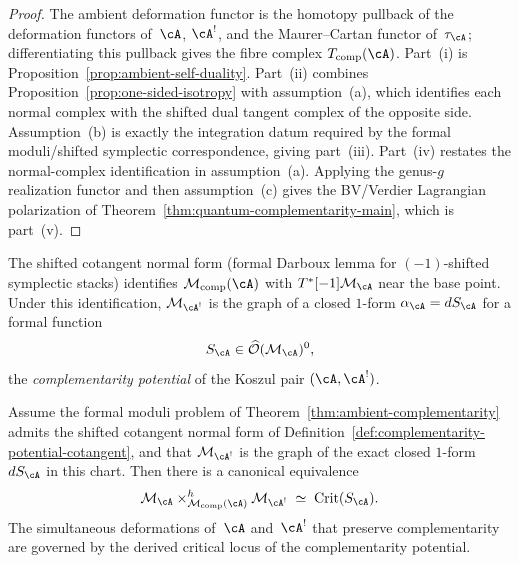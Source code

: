 \begin{proof}
The ambient deformation functor is the homotopy pullback of the
deformation functors of~$\cA$, $\cA^!$, and the
Maurer--Cartan functor of~$\tau_\cA$; differentiating this
pullback gives the fibre complex
$T_{\mathrm{comp}}(\cA)$. Part~\textup{(i)} is
Proposition~\ref{prop:ambient-self-duality}. Part~\textup{(ii)}
combines Proposition~\ref{prop:one-sided-isotropy} with
assumption~\textup{(a)}, which identifies each normal complex
with the shifted dual tangent complex of the opposite side.
Assumption~\textup{(b)} is exactly the integration datum required
by the formal moduli/shifted symplectic correspondence, giving
part~\textup{(iii)}. Part~\textup{(iv)} restates the
normal-complex identification in assumption~\textup{(a)}.
Applying the genus-$g$ realization functor and then
assumption~\textup{(c)} gives the BV/Verdier Lagrangian
polarization of Theorem~\ref{thm:quantum-complementarity-main},
which is part~\textup{(v)}.
\end{proof}

\begin{definition}
\label{def:complementarity-potential-cotangent}
The shifted cotangent normal form
(formal Darboux lemma for $(-1)$-shifted symplectic stacks)
identifies $\mathcal{M}_{\mathrm{comp}}(\cA)$ with
$T^*[-1]\mathcal{M}_\cA$ near the base point. Under this
identification, $\mathcal{M}_{\cA^!}$ is the graph of a
closed $1$-form $\alpha_\cA = dS_\cA$ for a formal function
\[
S_\cA \in \widehat{\mathcal{O}}(\mathcal{M}_\cA)^0,
\]
the \emph{complementarity potential} of the Koszul pair
$(\cA, \cA^!)$.
\end{definition}

\begin{proposition}
\label{prop:derived-critical-locus-chk}
Assume the formal moduli problem of
Theorem~\textup{\ref{thm:ambient-complementarity}} admits the
shifted cotangent normal form of
Definition~\textup{\ref{def:complementarity-potential-cotangent}},
and that $\mathcal{M}_{\cA^!}$ is the graph of the exact closed
$1$-form $dS_\cA$ in this chart. Then there is a canonical
equivalence
\[
\mathcal{M}_\cA \times^h_{\mathcal{M}_{\mathrm{comp}}(\cA)}
\mathcal{M}_{\cA^!}
\;\simeq\;
\mathrm{Crit}(S_\cA).
\]
The simultaneous deformations of~$\cA$ and~$\cA^!$ that
preserve complementarity are governed by the derived
critical locus of the complementarity potential.
\end{proposition}

